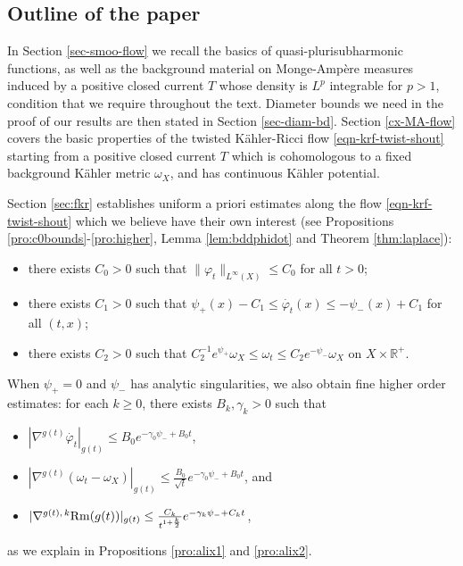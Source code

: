 \documentclass[a4paper,11pt,leqno,english]{smfart}
\theoremstyle{plain}
\theoremstyle{plain}
\newtheorem{bigcoro}[bigthm]{Corollary}
\numberwithin{equation}{section} %
\numberwithin{figure}{section} %
\theoremstyle{plain}
\theoremstyle{plain}
\theoremstyle{remark}
\theoremstyle{remark}
\theoremstyle{definition}
\theoremstyle{plain}
\theoremstyle{plain}
\theoremstyle{definition}
\newcommand{\R}{{\mathbb{R}}}
\newcommand{\f}{\varphi}
\newcommand{\p}{\psi}
\begin{document}
   
   

 



 
 \subsection{Outline of the paper}
In Section \ref{sec-smoo-flow} we recall the basics of quasi-plurisubharmonic functions, as well as the background material on Monge-Amp\`ere measures induced by a positive closed current $T$ whose density is $L^p$ integrable for $p>1$, condition that we require throughout the text. Diameter bounds we need in the proof of our results are then stated in Section \ref{sec-diam-bd}. 
 Section \ref{cx-MA-flow}  covers the basic properties of the twisted K\"ahler-Ricci flow \eqref{eqn-krf-twist-shout} starting from a positive closed current $T$ which is cohomologous to a fixed background K\"ahler metric $\omega_X$, 
and has continuous K\"ahler potential.

Section \ref{sec:fkr}  establishes
 uniform a priori estimates along the 
 flow \eqref{eqn-krf-twist-shout} which we believe have their own interest (see Propositions \ref{pro:c0bounds}-\ref{pro:higher}, Lemma \ref{lem:bddphidot} and Theorem \ref{thm:laplace}):
\begin{itemize}
\item[$\bullet$] there exists $C_0>0$ such that $\|\f_t\|_{L^{\infty}(X)} \leq C_0$ for all $t>0$;
\item[$\bullet$] there exists $C_1>0$ such that
$\p_+(x)-C_1 \leq \dot{\f_t}(x) \leq -\p_-(x)+C_1$ for all $(t,x)$;
\item[$\bullet$]  there exists $C_2>0$ such that
$C_2^{-1} e^{\p_+} \omega_X \leq \omega_t \leq C_2e^{-\p_-} \omega_X$ on $X \times \R^+$.
\end{itemize}
When $\p_+=0$ and $\p_-$ has analytic singularities, we also obtain fine higher order estimates:
for each $k\geq 0$, there exists $B_k,\gamma_k>0$ such that 
\begin{itemize}
\item[$\bullet$] $|\nabla^{g(t)}\dot{\f_t}|_{g(t)}\leq B_0 e^{-\gamma_0 \psi_{-}+B_0t}$, 
\item[$\bullet$] $|\nabla^{g(t)}(\omega_t-\omega_X)|_{g(t)}\leq\frac{B_0}{\sqrt{t}}e^{-\gamma_0\psi_{-}+B_0t}$, and
\item[$\bullet$] $ |\nabla^{g(t),\,k} {\rm Rm}(g(t))|_{g(t)}\leq\frac{C_k}{t^{1+\frac{k}{2}}}e^{-\gamma_k\psi_{-}+C_kt}$,
\end{itemize}
as we explain in Propositions  \ref{pro:alix1} and \ref{pro:alix2}.
\end{document}
